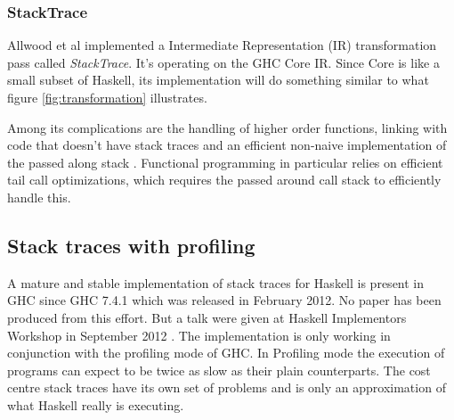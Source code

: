 \subsubsection{StackTrace}

Allwood et al implemented a Intermediate Representation (IR) transformation
pass called \emph{StackTrace}. It's operating on the GHC Core IR. Since
Core is like a small subset of Haskell, its implementation will do
something similar to what figure \ref{fig:transformation} illustrates.

Among its complications are the
handling of higher order functions, linking with code that doesn't have stack
traces and an efficient non-naive implementation of the
passed along stack \cite{FindingTheNeedle2009}.
Functional programming in particular relies on efficient tail call
optimizations, which
requires the passed around call stack to efficiently handle this.



\subsection{Stack traces with profiling} \label{sec:stack_traces_with_profiling}

A mature and stable implementation of stack traces for
Haskell is present in GHC since GHC 7.4.1 which was released in February
2012. No paper has been produced from this effort. But a talk were
given at Haskell Implementors Workshop in September 2012 \cite{HIW2012Programme}.
The implementation is only working in conjunction with the profiling
mode of GHC. In Profiling mode the execution of programs can expect to
be twice as slow as their plain counterparts. The cost centre stack traces
have its own set of problems and is only an approximation of what Haskell
really is executing.

